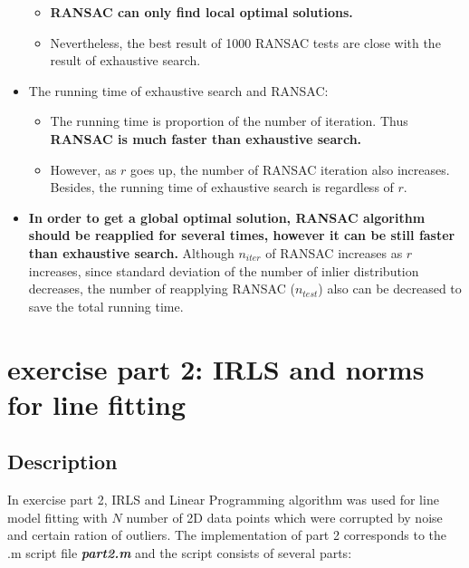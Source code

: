\documentclass[paper=a4, fontsize=11pt]{scrartcl} %
\numberwithin{equation}{section} %
\numberwithin{figure}{section} %
\numberwithin{table}{section} %
\newcommand{\filename}[1]{\textbf{\textit{#1}}}
\begin{document}
\begin{itemize}
\begin{itemize}
		\item \textbf{RANSAC can only find local optimal solutions.}
		\item Nevertheless, the best result of 1000 RANSAC tests are close with the result of exhaustive search.
	\end{itemize}
\item The running time of exhaustive search and RANSAC:
	\begin{itemize}
		\item The running time is proportion of the number of iteration. Thus \textbf{RANSAC is much faster than exhaustive search.}
		\item However, as $r$ goes up, the number of RANSAC iteration also increases. Besides, the running time of exhaustive search is regardless of $r$.
	\end{itemize}
\item \textbf{In order to get a global optimal solution, RANSAC algorithm should be reapplied for several times, however it can be still faster than exhaustive search.} Although $n_{iter}$ of RANSAC increases as $r$ increases, since standard deviation of the number of inlier distribution decreases, the number of reapplying RANSAC ($n_{test}$) also can be decreased to save the total running time. 
\end{itemize}


\section{exercise part 2: IRLS and norms for line fitting}

\subsection{Description}

In exercise part 2, IRLS and Linear Programming algorithm was used for line model fitting with $N$ number of 2D data points which were corrupted by noise and certain ration of outliers. The implementation of part 2 corresponds to the .m script file \filename{part2.m} and the script consists of several parts: 
\end{document}
